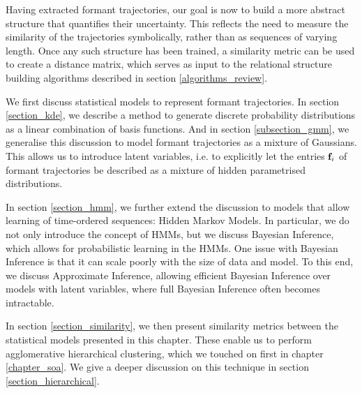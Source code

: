 \documentclass[../main.tex]{subfiles}
\begin{document}
 \label{chapter_hmms}

Having extracted formant trajectories, our goal is now to build a more abstract structure that quantifies their uncertainty. This reflects the need to measure the similarity of the trajectories symbolically, rather than as sequences of varying length. Once any such structure has been trained, a similarity metric can be used to create a distance matrix, which serves as input to the relational structure building algorithms described in section \ref{algorithms_review}.
\par We first discuss statistical models to represent formant trajectories. In section \ref{section_kde}, we describe a method to generate discrete probability distributions as a linear combination of basis functions. And in section \ref{subsection_gmm}, we generalise this discussion to model formant trajectories as a mixture of Gaussians. This allows us to introduce latent variables, i.e. to explicitly let the entries $\mathbf{f}_i$ of formant trajectories be described as a mixture of hidden parametrised distributions.
\par In section \ref{section_hmm}, we further extend the discussion to models that allow learning of time-ordered sequences: Hidden Markov Models. In particular, we do not only introduce the concept of HMMs, but we discuss Bayesian Inference, which allows for probabilistic learning in the HMMs. One issue with Bayesian Inference is that it can scale poorly with the size of data and model. To this end, we discuss Approximate Inference, allowing efficient Bayesian Inference over models with latent variables, where full Bayesian Inference often becomes intractable.
\par In section \ref{section_similarity}, we then present similarity metrics between the statistical models presented in this chapter. These enable us to perform agglomerative hierarchical clustering, which we touched on first in chapter \ref{chapter_soa}. We give a deeper discussion on this technique in section \ref{section_hierarchical}.
\end{document}
